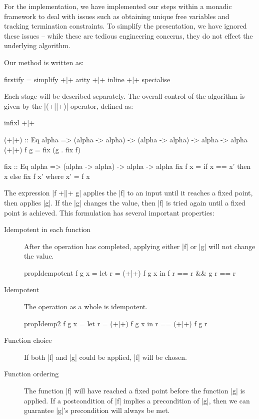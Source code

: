 \documentclass[preprint]{sigplanconf}
\begin{document}
For the implementation, we have implemented our steps within a monadic framework to deal with issues such as obtaining unique free variables and tracking termination constraints. To simplify the presentation, we have ignored these issues -- while these are tedious engineering concerns, they do not effect the underlying algorithm.

Our method is written as:

\begin{code}
firstify = simplify +|+ arity +|+ inline +|+ specialise
\end{code}

Each stage will be described separately. The overall control of the algorithm is given by the |(+||+)| operator, defined as:

\begin{code}
infixl +|+

(+|+) :: Eq alpha => (alpha -> alpha) -> (alpha -> alpha) -> alpha -> alpha
(+|+) f g = fix (g . fix f)

fix :: Eq alpha => (alpha -> alpha) -> alpha -> alpha
fix f x = if x == x' then x else fix f x'
    where x' = f x
\end{code}

The expression |f +||+ g| applies the |f| to an input until it reaches a fixed point, then applies |g|. If the |g| changes the value, then |f| is tried again until a fixed point is achieved. This formulation has several important properties:

\begin{description}
\item[Idempotent in each function] After the operation has completed, applying either |f| or |g| will not change the value.

\begin{code}
propIdempotent f g x = let r = (+|+) f g x in f r == r && g r == r
\end{code}

\item[Idempotent] The operation as a whole is idempotent.

\begin{code}
propIdemp2 f g x = let r = (+|+) f g x in r == (+|+) f g r
\end{code}

\item[Function choice] If both |f| and |g| could be applied, |f| will be chosen.

\item[Function ordering] The function |f| will have reached a fixed point before the function |g| is applied. If a postcondition of |f| implies a precondition of |g|, then we can guarantee |g|'s precondition will always be met.
\end{description}
\end{document}
